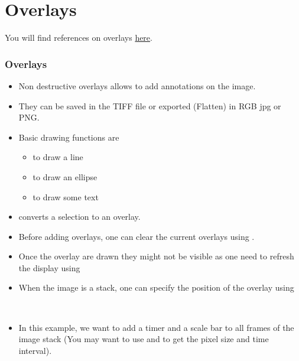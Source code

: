 \section{Overlays}
You will find references on overlays
\href{http://rsb.info.nih.gov/ij/developer/macro/functions.html#Overlay}{here}.
\begin{frame} \frametitle<presentation>{Overlays}
  \begin{itemize}
  \item Non destructive overlays allows to add annotations on the
    image.
  \item They can be saved in the TIFF file or exported (Flatten) in
    RGB jpg or PNG.
  \item Basic drawing functions are
    \begin{itemize}
    \item {} to draw a line
    \item {} to draw an ellipse
    \item {} to draw some text
    \end{itemize}
  \item {} converts a selection
    to an overlay.
  \item Before adding overlays, one can clear the current overlays
    using .
  \item Once the overlay are drawn they might not be visible as one
    need to refresh the display using 
  \item When the image is a stack, one can specify the position of the
    overlay using 
  \end{itemize}
\end{frame}

\begin{frame}[fragile]
  \begin{example}~\par
    \begin{itemize}
    \item In this example, we want to add a timer and a scale bar to
      all frames of the image stack (You may want to use  and  to get the pixel size and time interval).
       \only<presentation>{}
    \end{itemize}
  \end{example}
\end{frame}


